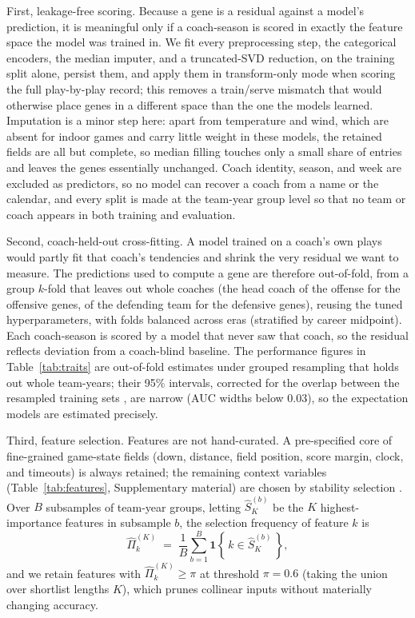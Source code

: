 \documentclass[
  journal=ehs,
  manuscript=article,
  year=2026,
  volume=8,
]{cup-journal}
\begin{document}
First, leakage-free scoring. Because a gene is a residual against a model's
prediction, it is meaningful only if a coach-season is scored in exactly the feature
space the model was trained in. We fit every preprocessing step, the categorical
encoders, the median imputer, and a truncated-SVD reduction, on the training split
alone, persist them, and apply them in transform-only mode when scoring the full
play-by-play record; this removes a train/serve mismatch that would otherwise place
genes in a different space than the one the models learned. Imputation is a minor
step here: apart from temperature and wind, which are absent for indoor games and
carry little weight in these models, the retained fields are all but complete, so
median filling touches only a small share of entries and leaves the genes essentially
unchanged. Coach identity, season,
and week are excluded as predictors, so no model can recover a coach from a name or
the calendar, and every split is made at the team-year group level so that no team
or coach appears in both training and evaluation.

Second, coach-held-out cross-fitting. A model trained on a coach's own plays would
partly fit that coach's tendencies and shrink the very residual we want to measure.
The predictions used to compute a gene are therefore out-of-fold, from a group
$k$-fold that leaves out whole coaches (the head coach of the offense for the
offensive genes, of the defending team for the defensive genes), reusing the tuned
hyperparameters, with folds balanced across eras (stratified by career midpoint).
Each coach-season is scored by a model that never saw that coach, so the residual
reflects deviation from a coach-blind baseline. The performance figures in
Table~\ref{tab:traits} are out-of-fold estimates under grouped resampling that holds
out whole team-years; their 95\% intervals, corrected for the overlap between the
resampled training sets \parencite{nadeau2003}, are narrow (AUC widths below 0.03), so
the expectation models are estimated precisely.

Third, feature selection. Features are not hand-curated. A
pre-specified core of fine-grained game-state fields (down, distance, field
position, score margin, clock, and timeouts) is always retained; the remaining
context variables (Table~\ref{tab:features}, Supplementary material) are chosen by
stability selection \parencite{meinshausen2010}. Over $B$ subsamples of team-year groups, letting
$\hat{S}_K^{(b)}$ be the $K$ highest-importance features in subsample $b$, the
selection frequency of feature $k$ is
\begin{equation}
  \hat{\Pi}_k^{(K)} \;=\; \frac{1}{B}\sum_{b=1}^{B}
    \mathbf{1}\!\left\{\, k \in \hat{S}_K^{(b)} \,\right\},
  \label{eq:stability}
\end{equation}
and we retain features with $\hat{\Pi}_k^{(K)} \ge \pi$ at threshold $\pi = 0.6$
(taking the union over shortlist lengths $K$), which prunes collinear inputs without
materially changing accuracy.
\end{document}
